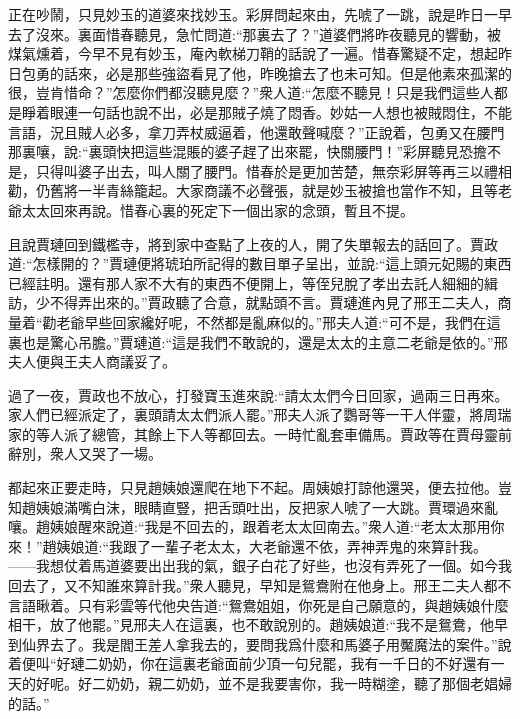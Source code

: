 \begin{parag}
    正在吵鬧，只見妙玉的道婆來找妙玉。彩屏問起來由，先唬了一跳，說是昨日一早去了沒來。裏面惜春聽見，急忙問道:“那裏去了？”道婆們將昨夜聽見的響動，被煤氣燻着，今早不見有妙玉，庵內軟梯刀鞘的話說了一遍。惜春驚疑不定，想起昨日包勇的話來，必是那些強盜看見了他，昨晚搶去了也未可知。但是他素來孤潔的很，豈肯惜命？”怎麼你們都沒聽見麼？”衆人道:“怎麼不聽見！只是我們這些人都是睜着眼連一句話也說不出，必是那賊子燒了悶香。妙姑一人想也被賊悶住，不能言語，況且賊人必多，拿刀弄杖威逼着，他還敢聲喊麼？”正說着，包勇又在腰門那裏嚷，說:“裏頭快把這些混賬的婆子趕了出來罷，快關腰門！”彩屏聽見恐擔不是，只得叫婆子出去，叫人關了腰門。惜春於是更加苦楚，無奈彩屏等再三以禮相勸，仍舊將一半青絲籠起。大家商議不必聲張，就是妙玉被搶也當作不知，且等老爺太太回來再說。惜春心裏的死定下一個出家的念頭，暫且不提。
\end{parag}


\begin{parag}
    且說賈璉回到鐵檻寺，將到家中查點了上夜的人，開了失單報去的話回了。賈政道:“怎樣開的？”賈璉便將琥珀所記得的數目單子呈出，並說:“這上頭元妃賜的東西已經註明。還有那人家不大有的東西不便開上，等侄兒脫了孝出去託人細細的緝訪，少不得弄出來的。”賈政聽了合意，就點頭不言。賈璉進內見了邢王二夫人，商量着“勸老爺早些回家纔好呢，不然都是亂麻似的。”邢夫人道:“可不是，我們在這裏也是驚心吊膽。”賈璉道:“這是我們不敢說的，還是太太的主意二老爺是依的。”邢夫人便與王夫人商議妥了。
\end{parag}


\begin{parag}
    過了一夜，賈政也不放心，打發寶玉進來說:“請太太們今日回家，過兩三日再來。家人們已經派定了，裏頭請太太們派人罷。”邢夫人派了鸚哥等一干人伴靈，將周瑞家的等人派了總管，其餘上下人等都回去。一時忙亂套車備馬。賈政等在賈母靈前辭別，衆人又哭了一場。
\end{parag}


\begin{parag}
    都起來正要走時，只見趙姨娘還爬在地下不起。周姨娘打諒他還哭，便去拉他。豈知趙姨娘滿嘴白沫，眼睛直豎，把舌頭吐出，反把家人唬了一大跳。賈環過來亂嚷。趙姨娘醒來說道:“我是不回去的，跟着老太太回南去。”衆人道:“老太太那用你來！”趙姨娘道:“我跟了一輩子老太太，大老爺還不依，弄神弄鬼的來算計我。——我想仗着馬道婆要出出我的氣，銀子白花了好些，也沒有弄死了一個。如今我回去了，又不知誰來算計我。”衆人聽見，早知是鴛鴦附在他身上。邢王二夫人都不言語瞅着。只有彩雲等代他央告道:“鴛鴦姐姐，你死是自己願意的，與趙姨娘什麼相干，放了他罷。”見邢夫人在這裏，也不敢說別的。趙姨娘道:“我不是鴛鴦，他早到仙界去了。我是閻王差人拿我去的，要問我爲什麼和馬婆子用魘魔法的案件。”說着便叫“好璉二奶奶，你在這裏老爺面前少頂一句兒罷，我有一千日的不好還有一天的好呢。好二奶奶，親二奶奶，並不是我要害你，我一時糊塗，聽了那個老娼婦的話。”
\end{parag}


